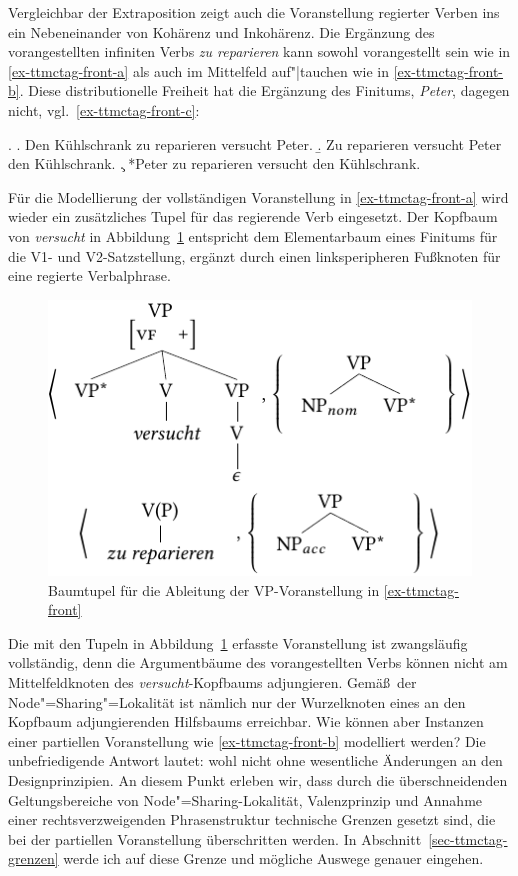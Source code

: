 Vergleichbar der Extraposition zeigt auch die Voranstellung regierter Verben ins  ein Nebeneinander von Kohärenz und Inkohärenz. Die Ergänzung des vorangestellten infiniten Verbs {\it zu reparieren} kann sowohl vorangestellt sein wie in \ref{ex-ttmctag-front-a} als auch im Mittelfeld auf"|tauchen wie in \ref{ex-ttmctag-front-b}. Diese distributionelle Freiheit hat die Ergänzung des Finitums, {\it Peter}, dagegen nicht, vgl.\ \ref{ex-ttmctag-front-c}: 

\ex. \label{ex-ttmctag-front}
\a. Den Kühlschrank zu reparieren versucht Peter. \label{ex-ttmctag-front-a}
\b. Zu reparieren versucht Peter den Kühlschrank. \label{ex-ttmctag-front-b}
\c. *Peter zu reparieren versucht den Kühlschrank. \label{ex-ttmctag-front-c}

Für die Modellierung der vollständigen Voranstellung in \ref{ex-ttmctag-front-a} wird wieder ein zusätzliches Tupel für das regierende Verb eingesetzt. Der Kopfbaum von {\it versucht} in Abbildung~\ref{fig-ttmctag-front} entspricht dem Elementarbaum eines Finitums für die V1- und V2-Satzstellung, ergänzt durch einen linksperipheren Fu\ss knoten für eine regierte Verbalphrase.

\begin{figure}[t]
\centering
\includegraphics{graphics/abb716.pdf}
\caption{\label{fig-ttmctag-front}Baumtupel für die Ableitung der VP-Voranstellung in \ref{ex-ttmctag-front}}
\end{figure}

Die mit den Tupeln in Abbildung~\ref{fig-ttmctag-front} erfasste Voranstellung ist zwangsläufig vollständig, denn die Argumentbäume des vorangestellten Verbs können nicht am Mittelfeldknoten des {\it versucht}-Kopfbaums adjungieren. Gemä\ss\ der Node"=Sharing"=Lokalität ist nämlich nur der Wurzelknoten eines an den Kopfbaum adjungierenden Hilfsbaums erreichbar. Wie können aber Instanzen einer partiellen Voranstellung wie \ref{ex-ttmctag-front-b} modelliert werden? Die unbefriedigende Antwort lautet: wohl nicht ohne wesentliche Änderungen an den Designprinzipien. An diesem Punkt erleben wir, dass durch die überschneidenden Geltungsbereiche von Node"=Sharing-Lokalität, Valenzprinzip und Annahme einer rechtsverzweigenden Phrasenstruktur technische Grenzen gesetzt sind, die bei der partiellen Voranstellung überschritten werden. In Abschnitt~\ref{sec-ttmctag-grenzen} werde ich auf diese Grenze und mögliche Auswege genauer eingehen.

